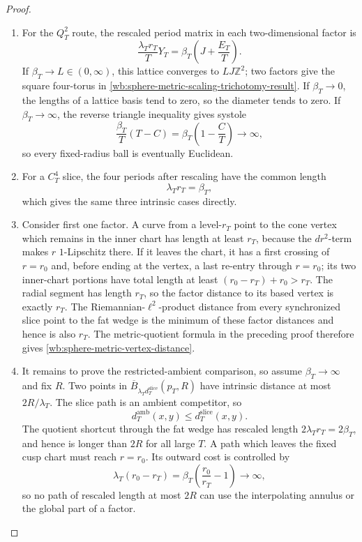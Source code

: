 \begin{proof}
\begin{enumerate}[label=\arabic*.,leftmargin=*]
\item For the \(Q_T^2\) route, the rescaled period matrix in each two-dimensional
factor is
\[
 \frac{\lambda_Tr_T}{T}Y_T
 =\beta_T\left(J+\frac{E_T}{T}\right).
\]
If \(\beta_T\to L\in(0,\infty)\), this lattice converges to
\(LJ\mathbb Z^2\); two factors give the square four-torus in
\eqref{wb:sphere-metric-scaling-trichotomy-result}.  If
\(\beta_T\to0\), the lengths of a lattice basis tend to zero, so the
diameter tends to zero.  If \(\beta_T\to\infty\), the reverse triangle
inequality gives systole
\[
 \frac{\beta_T}{T}(T-C)
 =\beta_T\left(1-\frac CT\right)\longrightarrow\infty,
\]
so every fixed-radius ball is eventually Euclidean.

\item For a \(C_T^4\) slice, the four periods after rescaling have the common
length
\[
 \lambda_Tr_T=\beta_T,
\]
which gives the same three intrinsic cases directly.

\item Consider first one factor.  A curve from a level-\(r_T\) point to the cone
vertex which remains in the inner chart has length at least \(r_T\), because
the \(dr^2\)-term makes \(r\) \(1\)-Lipschitz there.  If it leaves the
chart, it has a first crossing of \(r=r_0\) and, before ending at the
vertex, a last re-entry through \(r=r_0\); its two inner-chart portions
have total length at least
\((r_0-r_T)+r_0>r_T\).  The radial segment has length \(r_T\), so the
factor distance to its based vertex is exactly \(r_T\).  The
Riemannian-\(\ell^2\)-product distance from every synchronized slice point
to the fat wedge is the minimum of these factor distances and hence is
also \(r_T\).  The metric-quotient formula in the preceding proof therefore
gives \eqref{wb:sphere-metric-vertex-distance}.

\item It remains to prove the restricted-ambient comparison, so assume
\(\beta_T\to\infty\) and fix \(R\).  Two points in
\(\overline B_{\lambda_Td_T^{\mathrm{slice}}}(p_T,R)\) have intrinsic
distance at most \(2R/\lambda_T\).  The slice path is an ambient competitor,
so
\[
 d_T^{\mathrm{amb}}(x,y)\leq d_T^{\mathrm{slice}}(x,y).
\]
The quotient shortcut through the fat wedge has rescaled length
\(2\lambda_Tr_T=2\beta_T\), and hence is longer than \(2R\) for all large
\(T\).  A path which leaves the fixed cusp chart must reach \(r=r_0\).
Its outward cost is controlled by
\begin{equation}
 \lambda_T(r_0-r_T)
 =\beta_T\left(\frac{r_0}{r_T}-1\right)\longrightarrow\infty,
 \label{wb:sphere-metric-outward-shortcut-exclusion}
\end{equation}
so no path of rescaled length at most \(2R\) can use the interpolating
annulus or the global part of a factor.


\end{enumerate}
\end{proof}
